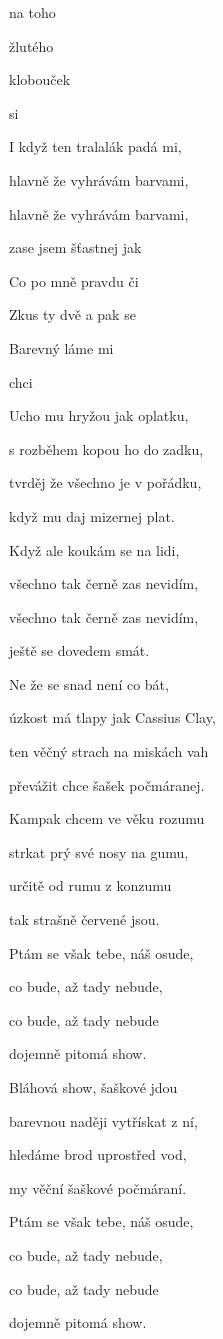 

\zs
{} na toho 

 žlutého 

 klobouček 

 si   
\ks

\zs
I když ten tralalák padá mi,

hlavně že vyhrávám barvami,

hlavně že vyhrávám barvami,

zase jsem šťastnej jak   
\ks

\zr
Co po mně  pravdu či 

Zkus ty dvě  a pak se 

Barevný  láme mi 

 chci  
\kr

\zs
Ucho mu hryžou jak oplatku,

s rozběhem kopou ho do zadku,

tvrděj že všechno je v pořádku,

když mu daj mizernej plat.
\ks

\zs
Když ale koukám se na lidi,

všechno tak černě zas nevidím,

všechno tak černě zas nevidím,

ještě se dovedem smát.
\ks

\zr
Ne že se snad není co bát,

úzkost má tlapy jak Cassius Clay,

ten věčný strach na miskách vah

převážit chce šašek počmáranej.
\kr

\zs
Kampak chcem ve věku rozumu

strkat prý své nosy na gumu,

určitě od rumu z konzumu

tak strašně červené jsou.
\ks

\zs
Ptám se však tebe, náš osude,

co bude, až tady nebude,

co bude, až tady nebude

dojemně pitomá show.
\ks

\zr
Bláhová show, šaškové jdou

barevnou naději vytřískat z ní,

hledáme brod uprostřed vod,

my věční šaškové počmáraní.
\kr

\zs
Ptám se však tebe, náš osude,

co bude, až tady nebude,

co bude, až tady nebude

dojemně pitomá show.
\ks
\kp
